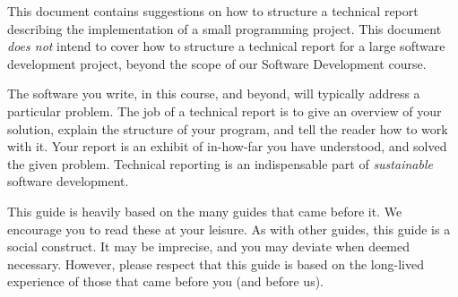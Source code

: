 This document contains suggestions on how to structure a technical report
describing the implementation of a small programming project. This document
\emph{does not} intend to cover how to structure a technical report for a large
software development project, beyond the scope of our Software Development
course.

\medskip

The software you write, in this course, and beyond, will typically address a
particular problem. The job of a technical report is to give an overview of
your solution, explain the structure of your program, and tell the reader how
to work with it. Your report is an exhibit of in-how-far you have understood,
and solved the given problem. Technical reporting is an indispensable part of
\emph{sustainable} software development.

\medskip

This guide is heavily based on the many guides that came before
it\cite{sestoft2002, foerstehjaelp2005, julegave1996, kunst2007}. We encourage
you to read these at your leisure. As with other guides, this guide is a social
construct.  It may be imprecise, and you may deviate when deemed necessary.
However, please respect that this guide is based on the long-lived experience
of those that came before you (and before us).

